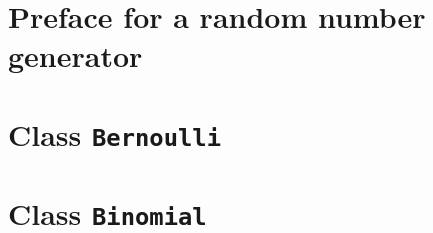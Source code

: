 \documentclass{report}
\begin{document}



\pagestyle{empty}



\clearpage
\pagestyle{empty}
\setcounter{page}{1}



\clearpage
\pagestyle{plain}
\setcounter{page}{1}
\tableofcontents


\clearpage
{}
\setcounter{page}{1}
\chapter{Preface for a random number generator}



\clearpage
\chapter{Class {\tt Bernoulli}}



\clearpage
\chapter{Class {\tt Binomial}}



\clearpage
\end{document}
